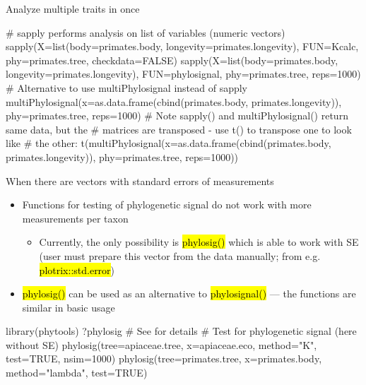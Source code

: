 \documentclass[compress, ucs, xelatex, 11pt, xcolor=svgnames,
	hyperref={
		bookmarks=true,
		unicode=true,
		colorlinks=true,
		pdftitle={Molecular data in R},
		plainpages=false,
		pdfauthor={Vojtech Zeisek},
		pdfsubject={Course about phylogeny and evolution in R},
		pdfcreator={XeLaTeX},
		pdfkeywords={R, evolution, phylogeny, molecular data},
		linkcolor=Tomato,
		anchorcolor=SaddleBrown,
		citecolor=Goldenrod,
		filecolor=DarkMagenta,
		menucolor=Sienna,
		urlcolor=DarkTurquoise,
		pdftex},
	url={hyphens, lowtilde} %
	]{beamer}
\renewcommand{\texttt}[1]{\hl{\ttfamily #1}}
\begin{document}
\begin{frame}[fragile]{Analyze multiple traits in once}
	\begin{spluscode}
    # sapply performs analysis on list of variables (numeric vectors)
    sapply(X=list(body=primates.body, longevity=primates.longevity),
      FUN=Kcalc, phy=primates.tree, checkdata=FALSE)
    sapply(X=list(body=primates.body, longevity=primates.longevity),
      FUN=phylosignal, phy=primates.tree, reps=1000)
    # Alternative to use multiPhylosignal instead of sapply
    multiPhylosignal(x=as.data.frame(cbind(primates.body,
      primates.longevity)), phy=primates.tree, reps=1000)
    # Note sapply() and multiPhylosignal() return same data, but the
    # matrices are transposed - use t() to transpose one to look like
    # the other:
    t(multiPhylosignal(x=as.data.frame(cbind(primates.body,
      primates.longevity)), phy=primates.tree, reps=1000))
	\end{spluscode}
\end{frame}

\begin{frame}[fragile]{When there are vectors with standard errors of measurements}
	\begin{itemize}
		\item Functions for testing of phylogenetic signal do not work with more measurements per taxon
		\begin{itemize}
			\item Currently, the only possibility is \texttt{phylosig()} which is able to work with SE (user must prepare this vector from the data manually; from e.g. \texttt{plotrix::std.error})
		\end{itemize}
		\item \texttt{phylosig()} can be used as an alternative to \texttt{phylosignal()} --- the functions are similar in basic usage
	\end{itemize}
	\begin{spluscode}
    library(phytools)
    ?phylosig # See for details
    # Test for phylogenetic signal (here without SE)
    phylosig(tree=apiaceae.tree, x=apiaceae.eco, method="K", test=TRUE,
      nsim=1000)
    phylosig(tree=primates.tree, x=primates.body, method="lambda",
      test=TRUE)
	\end{spluscode}
\end{frame}
\end{document}
